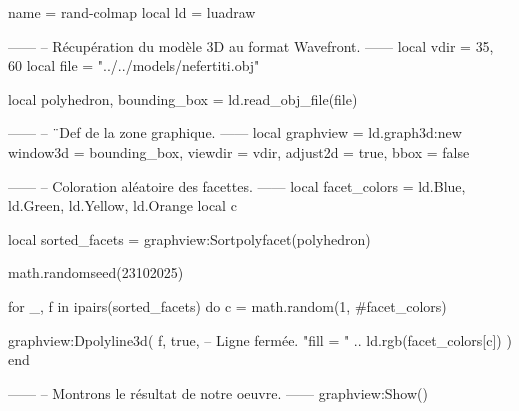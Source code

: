 \documentclass[border = 3pt]{standalone}
\begin{document}
\begin{luadraw*}{name = rand-colmap}
local ld = luadraw

------
-- Récupération du modèle 3D au format Wavefront.
------
local vdir = {35, 60}
local file = "../../models/nefertiti.obj"

local polyhedron, bounding_box = ld.read_obj_file(file)

------
-- ¨Def de la zone graphique.
------
local graphview = ld.graph3d:new{
  window3d = bounding_box,
  viewdir  = vdir,
  adjust2d = true,
  bbox     = false
}

------
-- Coloration aléatoire des facettes.
------
local facet_colors = {ld.Blue, ld.Green, ld.Yellow, ld.Orange}
local c

local sorted_facets = graphview:Sortpolyfacet(polyhedron)

math.randomseed(23102025)

for _, f in ipairs(sorted_facets) do
  c = math.random(1, #facet_colors)

  graphview:Dpolyline3d(
    f,
    true,  -- Ligne fermée.
    "fill = " .. ld.rgb(facet_colors[c])
  )
end

------
-- Montrons le résultat de notre oeuvre.
------
graphview:Show()
\end{luadraw*}
\end{document}
